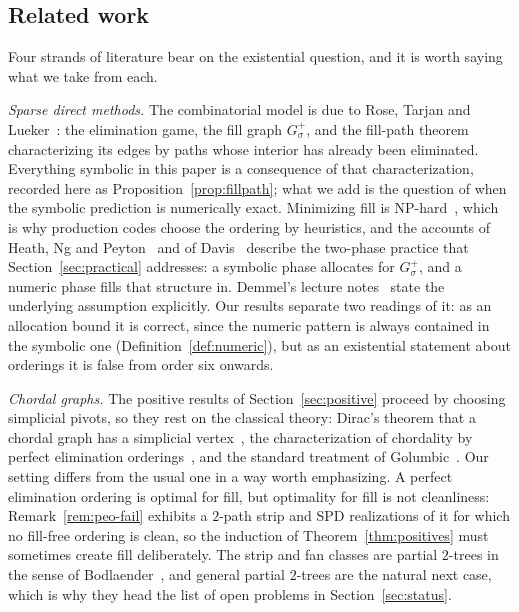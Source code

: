 \documentclass[11pt]{article}
\theoremstyle{plain}
\theoremstyle{definition}
\begin{document}
\begin{humanblock}
\subsection{Related work}

Four strands of literature bear on the existential question, and it is worth saying what we take from
each.

\emph{Sparse direct methods.} The combinatorial model is due to Rose, Tarjan and Lueker~\cite{Rose}:
the elimination game, the fill graph $G^+_\sigma$, and the fill-path theorem characterizing its edges
by paths whose interior has already been eliminated. Everything symbolic in this paper is a
consequence of that characterization, recorded here as Proposition~\ref{prop:fillpath}; what we add is
the question of when the symbolic prediction is numerically exact. Minimizing fill is
NP-hard~\cite{Yannakakis}, which is why production codes choose the ordering by heuristics, and the
accounts of Heath, Ng and Peyton~\cite{Heath} and of Davis~\cite{Davis} describe the two-phase
practice that Section~\ref{sec:practical} addresses: a symbolic phase allocates for $G^+_\sigma$, and
a numeric phase fills that structure in. Demmel's lecture notes~\cite{Demmel} state the underlying
assumption explicitly. Our results separate two readings of it: as an allocation bound it is correct,
since the numeric pattern is always contained in the symbolic one (Definition~\ref{def:numeric}), but
as an existential statement about orderings it is false from order six onwards.

\emph{Chordal graphs.} The positive results of Section~\ref{sec:positive} proceed by choosing
simplicial pivots, so they rest on the classical theory: Dirac's theorem that a chordal graph has a
simplicial vertex~\cite{Dirac}, the characterization of chordality by perfect elimination
orderings~\cite{Fulkerson}, and the standard treatment of Golumbic~\cite{Golumbic}. Our setting
differs from the usual one in a way worth emphasizing. A perfect elimination ordering is optimal for
fill, but optimality for fill is not cleanliness: Remark~\ref{rem:peo-fail} exhibits a $2$-path strip
and SPD realizations of it for which no fill-free ordering is clean, so the induction of
Theorem~\ref{thm:positives} must sometimes create fill deliberately. The strip and fan classes are
partial $2$-trees in the sense of Bodlaender~\cite{Bodlaender}, and general partial $2$-trees are the
natural next case, which is why they head the list of open problems in Section~\ref{sec:status}.


\end{humanblock}
\end{document}
